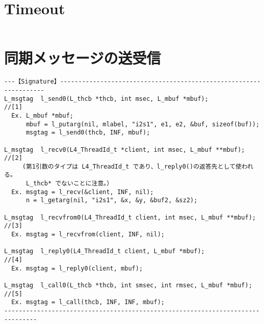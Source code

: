 \section{Timeout}

\begin{verbatim}

\end{verbatim}

\hspace{3cm}


\section{同期メッセージの送受信}

\begin{verbatim}
---【Signature】------------------------------------------------------------------
L_msgtag  l_send0(L_thcb *thcb, int msec, L_mbuf *mbuf);           //[1]
  Ex. L_mbuf *mbuf;
      mbuf = l_putarg(nil, mlabel, "i2s1", e1, e2, &buf, sizeof(buf));
      msgtag = l_send0(thcb, INF, mbuf);

L_msgtag  l_recv0(L4_ThreadId_t *client, int msec, L_mbuf **mbuf);  //[2]
     (第1引数のタイプは L4_ThreadId_t であり、l_reply0()の返答先として使われる。
      L_thcb* でないことに注意。）
  Ex. msgtag = l_recv(&client, INF, nil);
      n = l_getarg(nil, "i2s1", &x, &y, &buf2, &sz2);

L_msgtag  l_recvfrom0(L4_ThreadId_t client, int msec, L_mbuf **mbuf); //[3]
  Ex. msgtag = l_recvfrom(client, INF, nil);

L_msgtag  l_reply0(L4_ThreadId_t client, L_mbuf *mbuf);              //[4]
  Ex. msgtag = l_reply0(client, mbuf);

L_msgtag  l_call0(L_thcb *thcb, int smsec, int rmsec, L_mbuf *mbuf); //[5]
  Ex. msgtag = l_call(thcb, INF, INF, mbuf);
-------------------------------------------------------------------------------
\end{verbatim}

